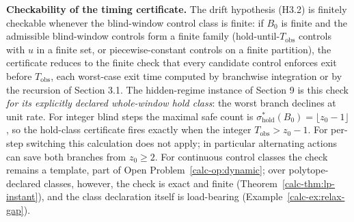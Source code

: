 \documentclass[10pt,twocolumn]{article}
\theoremstyle{definition}
\begin{document}
\textbf{Checkability of the timing certificate.} The drift hypothesis (H3.2) is finitely checkable whenever the blind-window control class is finite: if \(B_{0}\) is finite and the admissible blind-window controls form a finite family (hold-until-\(T_{\mathrm{obs}}\) controls with \(u\) in a finite set, or piecewise-constant controls on a finite partition), the certificate reduces to the finite check that every candidate control enforces exit before \(T_{\mathrm{obs}}\), each worst-case exit time computed by branchwise integration or by the recursion of Section 3.1. The hidden-regime instance of Section 9 is this check \emph{for its explicitly declared whole-window hold class}: the worst branch declines at unit rate. For integer blind steps the maximal safe count is \(\sigma^{*}_{\mathrm{hold}}(B_0)=\lfloor z_0-1\rfloor\), so the hold-class certificate fires exactly when the integer \(T_{\mathrm{obs}}>z_0-1\). For per-step switching this calculation does not apply; in particular alternating actions can save both branches from \(z_0\ge2\). For continuous control classes the check remains a template, part of
Open Problem~\ref{calc-op:dynamic}; over polytope-declared classes, however, the
check is exact and finite (Theorem~\ref{calc-thm:lp-instant}), and the class
declaration itself is load-bearing (Example~\ref{calc-ex:relax-gap}).
\end{document}
